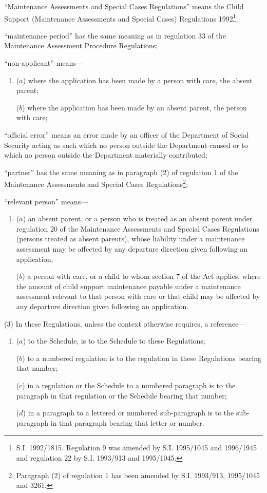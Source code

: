 \documentclass[12pt,a4paper]{article}
\begin{document}
\begin{enumerate}
“Maintenance Assessments and Special Cases Regulations” means the Child Support
(Maintenance Assessments and Special Cases) Regulations 1992\footnote{\frenchspacing S.I. 1992/1815. Regulation 9 was amended by S.I. 1995/1045 and 1996/1945 and regulation 22 by S.I. 1993/913 and 1995/1045.};

“maintenance period” has the same meaning as in regulation 33 of the Maintenance
Assessment Procedure Regulations;

“non-applicant” means—
\begin{enumerate}\item[]
($a$) where the application has been made by a person with care, the absent parent;

($b$) where the application has been made by an absent parent, the person with
care;
\end{enumerate}

“official error” means an error made by an officer of the Department of Social Security acting as such which no person outside the Department caused or to which no person outside the Department materially contributed;

“partner” has the same meaning as in paragraph (2) of regulation 1 of the
Maintenance Assessments and Special Cases Regulations\footnote{\frenchspacing Paragraph (2) of regulation 1 has been amended by S.I. 1993/913, 1995/1045 and 3261.};

“relevant person” means—
\begin{enumerate}\item[]
($a$) an absent parent, or a person who is treated as an absent parent under
regulation 20 of the Maintenance Assessments and Special Cases Regulations
(persons treated as absent parents), whose liability under a maintenance
assessment may be affected by any departure direction given following an
application;

($b$) a person with care, or a child to whom section 7 of the Act applies, where
the amount of child support maintenance payable under a maintenance assessment
relevant to that person with care or that child may be affected by any departure
direction given following an application.
\end{enumerate}
\end{enumerate}

(3) In these Regulations, unless the context otherwise requires, a reference—
\begin{enumerate}\item[]
($a$) to the Schedule, is to the Schedule to these Regulations;

($b$) to a numbered regulation is to the regulation in these Regulations bearing
that number;

($c$) in a regulation or the Schedule to a numbered paragraph is to the paragraph
in that regulation or the Schedule bearing that number;

($d$) in a paragraph to a lettered or numbered sub-paragraph is to the
sub-paragraph in that paragraph bearing that letter or number.
\end{enumerate}
\end{document}
